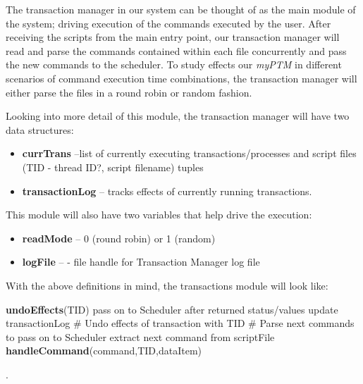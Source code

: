 The transaction manager in our system can be thought of as the main module of the system; driving execution of the commands executed by the user. After receiving the scripts from the main entry point, our transaction manager will read and parse the commands contained within each file concurrently and pass the new commands to the scheduler. To study effects our \textit{myPTM} in different scenarios of command execution time combinations, the transaction manager will either parse the files in a round robin or random fashion. 

Looking into more detail of this module, the transaction manager will have two data structures: 

\begin{itemize}
\item \textbf{currTrans} --list of currently executing transactions/processes and script files (TID - thread ID?, script filename) tuples
\item \textbf{transactionLog} --  tracks effects of currently running transactions.
\end{itemize}

This module will also have two variables that help drive the execution:

\begin{itemize}
\item \textbf{readMode} -- 0 (round robin) or 1 (random)
\item \textbf{logFile} --  - file handle for Transaction Manager log file
\end{itemize}

With the above definitions in mind, the transactions module will look like:

\begin{algorithmic}[1]
    \State \textbf{undoEffects}(TID)
    \EndIf
   \State pass on to Scheduler
   \State after returned status/values
   \State update transactionLog
   \EndFunction
   \State
   \State  \# Undo effects of transaction with TID
   \EndFunction
   \State
    \State  \# Parse next commands to pass on to Scheduler
    \State {}
    \State extract next command from scriptFile
    \State \textbf{handleCommand}(command,TID,dataItem)
    \EndFor
    \EndFunction
\end{algorithmic}  .\\